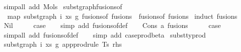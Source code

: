 \begin{isabellebody}
\isamarkupfalse%
\ {\isacharparenleft}{\kern0pt}simp{\isacharunderscore}{\kern0pt}all\ add{\isacharcolon}{\kern0pt}\ Mols{}{\isacharparenright}{\kern0pt}%
\endisatagproof
{\isafoldproof}%
%
\isadelimproof
\isanewline
%
\endisadelimproof
\isanewline
\isanewline
{}\isamarkupfalse%
\ subst{\isacharunderscore}{\kern0pt}graph{\isacharunderscore}{\kern0pt}fusions{\isacharunderscore}{\kern0pt}of{\isacharcolon}{\kern0pt}\isanewline
\ \ {\isachardoublequoteopen}map\ {\isacharparenleft}{\kern0pt}subst{\isacharunderscore}{\kern0pt}graph\ i\ xs\ g{}{\isacharparenright}{\kern0pt}\ {\isacharparenleft}{\kern0pt}fusions{\isacharunderscore}{\kern0pt}of\ fusions{\isacharparenright}{\kern0pt}\ {\isacharequal}{\kern0pt}\ fusions{\isacharunderscore}{\kern0pt}of\ fusions{\isachardoublequoteclose}\isanewline
%
\isadelimproof
%
\endisadelimproof
%
\isatagproof
{}\isamarkupfalse%
\ {\isacharparenleft}{\kern0pt}induct\ fusions{\isacharparenright}{\kern0pt}\isanewline
\ \ \isamarkupfalse%
\ Nil\isanewline
\ \ \isamarkupfalse%
\ \isamarkupfalse%
\ {\isacharquery}{\kern0pt}case\isanewline
\ \ \isamarkupfalse%
\ {\isacharparenleft}{\kern0pt}simp\ add{\isacharcolon}{\kern0pt}\ fusions{\isacharunderscore}{\kern0pt}of{\isacharunderscore}{\kern0pt}def{\isacharparenright}{\kern0pt}\isanewline
{}\isamarkupfalse%
\isanewline
\ \ \isamarkupfalse%
\ {\isacharparenleft}{\kern0pt}Cons\ a\ fusions{\isacharparenright}{\kern0pt}\isanewline
\ \ \isamarkupfalse%
\ \isamarkupfalse%
\ {\isacharquery}{\kern0pt}case\isanewline
\ \ \isamarkupfalse%
\ {\isacharparenleft}{\kern0pt}simp{\isacharunderscore}{\kern0pt}all\ add{\isacharcolon}{\kern0pt}\ fusions{\isacharunderscore}{\kern0pt}of{\isacharunderscore}{\kern0pt}def{\isacharparenright}{\kern0pt}\isanewline
\ \ \isamarkupfalse%
\ {\isacharparenleft}{\kern0pt}simp\ add{\isacharcolon}{\kern0pt}\ case{\isacharunderscore}{\kern0pt}prod{\isacharunderscore}{\kern0pt}beta{\isacharparenright}{\kern0pt}\isanewline
{}\isamarkupfalse%
%
\endisatagproof
{\isafoldproof}%
%
\isadelimproof
\isanewline
%
\endisadelimproof
\isanewline
\isanewline
{}\isamarkupfalse%
\ subst{\isacharunderscore}{\kern0pt}typrod{\isacharcolon}{\kern0pt}\isanewline
\ {\isachardoublequoteopen}subst{\isacharunderscore}{\kern0pt}graph\ i\ xs\ g{}\ {\isacharparenleft}{\kern0pt}app{\isacharunderscore}{\kern0pt}prodrule\ Ts\ rhs{\isacharparenright}{\kern0pt}\ {\isacharequal}{\kern0pt}\isanewline

\end{isabellebody}
